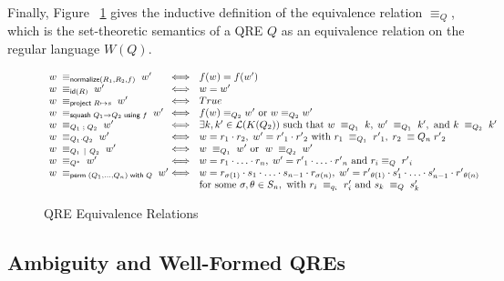 \documentclass[acmsmall,review,anonymous]{acmart}
\newcommand{\codefont}[1]{\ensuremath{\mathsf{#1}}}
\newcommand{\kw}[1]{\codefont{#1}}
\newcommand{\project}[2]{\ensuremath{\kw{project} \; #1 \mapsto #2}}
\newcommand{\squash}[3]{\ensuremath{\kw{squash} \; #1 \rightarrow #2\; \kw{using} \; #3}}
\newcommand{\perm}[2]{\ensuremath{\kw{perm}\; (#1)\; \kw{with}\; #2}}
\newcommand{\normalize}[3]{\ensuremath{\kw{normalize}(#1, #2, #3)}}
\newcommand{\eqrel}[1]{\ensuremath{\equiv_{#1}}}
\newcommand{\sep}{\ensuremath{\ | \ }}
\newcommand{\id}{\ensuremath{\kw{id}}}
\begin{document}
Finally, Figure ~\ref{fig:relations} gives the inductive definition of the
equivalence relation $\eqrel{Q}$, which is the set-theoretic semantics
of a QRE $Q$ as an equivalence relation on the regular language $W(Q)$.

\begin{figure}[t]
\centering
\[
\begin{array}{l@{}l@{\ \ }l}
w \; \equiv_{\normalize{R_1}{R_2}{f}} \; w' &\iff&
f(w)=f(w') \\
w \; \equiv_{\id(R)} \; w' &\iff& w = w' \\
w \; \equiv_{\project{R}{s}} \; w' &\iff& True \\ %
w \; \equiv_{\squash{Q_1}{Q_2}{f}} \; w' &\iff& f(w) \equiv_{Q_2} w'
\text{ or } w \equiv_{Q_2} w' \\
w \; \equiv_{Q_1 \; ; \; Q_2} \; w' &\iff& \exists k, k' \in
\mathcal{L}(K(Q_2)) \text{ such that } w \; \equiv_{Q_1} \; k, \; w' \;
\equiv_{Q_1} \; k', \text{ and } k \; \equiv_{Q_2} \; k'\\
w \; \equiv_{Q_1 \cdot Q_2} \; w'  &\iff& w = r_1
\cdot r_2, \; w' = {r'}_1 \cdot {r'}_2 \text{ with } r_1 \; \equiv_{Q_1}
\; {r'}_1, \; r_2 \; \equiv{Q_n} \; {r'}_2\\
w \; \equiv_{Q_1 \sep Q_2} \; w' &\iff& w \; \equiv_{Q_1} \; w'
\text{ or } \; w \; \equiv_{Q_2} \; w'\\
w \; \equiv_{Q^*} \; w' &\iff& w = r_1 \cdot \ldots \cdot r_n, \; w'
= {r'}_1 \cdot \ldots \cdot {r'}_n \text{ and } r_i \equiv_{Q} \; {r'}_i
\\
w \; \equiv_{\perm{Q_1, \ldots, Q_n}{Q}} \; w' &\iff& w = r_{\sigma(1)}
\cdot s_1 \cdot \ldots \cdot s_{n-1} \cdot r_{\sigma(n)}, \;
w' = {r'}_{\theta(1)} \cdot s'_1 \cdot \ldots \cdot s'_{n-1}
\cdot {r'}_{\theta(n)} \\
& & \text{for some } \sigma, \theta \in S_n, \text{ with } r_i \;
\equiv_{q_i} \; r'_i \text{ and } s_k \; \equiv_{Q} \; s'_{k}
\end{array}
\]
\caption{QRE Equivalence Relations}
\label{fig:relations}
\end{figure}
\subsection{Ambiguity and Well-Formed QREs}
\label{subsec:well-formed-qres}
\end{document}
